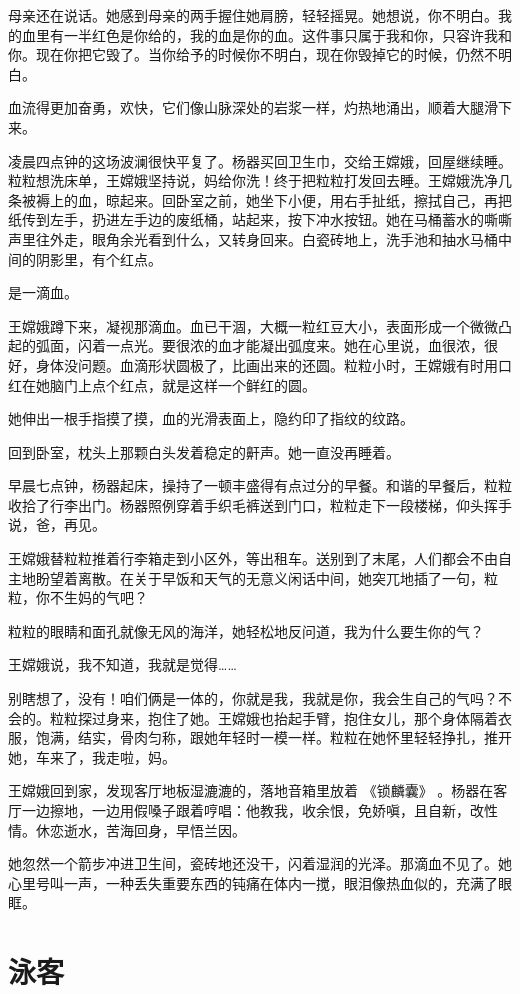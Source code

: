 \documentclass[lang=cn,newtx,12pt,scheme=chinese]{elegantbook}
\begin{document}
母亲还在说话。她感到母亲的两手握住她肩膀，轻轻摇晃。她想说，你不明白。我的血里有一半红色是你给的，我的血是你的血。这件事只属于我和你，只容许我和你。现在你把它毁了。当你给予的时候你不明白，现在你毁掉它的时候，仍然不明白。

血流得更加奋勇，欢快，它们像山脉深处的岩浆一样，灼热地涌出，顺着大腿滑下来。

凌晨四点钟的这场波澜很快平复了。杨器买回卫生巾，交给王嫦娥，回屋继续睡。粒粒想洗床单，王嫦娥坚持说，妈给你洗！终于把粒粒打发回去睡。王嫦娥洗净几条被褥上的血，晾起来。回卧室之前，她坐下小便，用右手扯纸，擦拭自己，再把纸传到左手，扔进左手边的废纸桶，站起来，按下冲水按钮。她在马桶蓄水的嘶嘶声里往外走，眼角余光看到什么，又转身回来。白瓷砖地上，洗手池和抽水马桶中间的阴影里，有个红点。

是一滴血。

王嫦娥蹲下来，凝视那滴血。血已干涸，大概一粒红豆大小，表面形成一个微微凸起的弧面，闪着一点光。要很浓的血才能凝出弧度来。她在心里说，血很浓，很好，身体没问题。血滴形状圆极了，比画出来的还圆。粒粒小时，王嫦娥有时用口红在她脑门上点个红点，就是这样一个鲜红的圆。

她伸出一根手指摸了摸，血的光滑表面上，隐约印了指纹的纹路。

回到卧室，枕头上那颗白头发着稳定的鼾声。她一直没再睡着。

早晨七点钟，杨器起床，操持了一顿丰盛得有点过分的早餐。和谐的早餐后，粒粒收拾了行李出门。杨器照例穿着手织毛裤送到门口，粒粒走下一段楼梯，仰头挥手说，爸，再见。

王嫦娥替粒粒推着行李箱走到小区外，等出租车。送别到了末尾，人们都会不由自主地盼望着离散。在关于早饭和天气的无意义闲话中间，她突兀地插了一句，粒粒，你不生妈的气吧？

粒粒的眼睛和面孔就像无风的海洋，她轻松地反问道，我为什么要生你的气？

王嫦娥说，我不知道，我就是觉得……

别瞎想了，没有！咱们俩是一体的，你就是我，我就是你，我会生自己的气吗？不会的。粒粒探过身来，抱住了她。王嫦娥也抬起手臂，抱住女儿，那个身体隔着衣服，饱满，结实，骨肉匀称，跟她年轻时一模一样。粒粒在她怀里轻轻挣扎，推开她，车来了，我走啦，妈。

王嫦娥回到家，发现客厅地板湿漉漉的，落地音箱里放着 《锁麟囊》 。杨器在客厅一边擦地，一边用假嗓子跟着哼唱：他教我，收余恨，免娇嗔，且自新，改性情。休恋逝水，苦海回身，早悟兰因。

她忽然一个箭步冲进卫生间，瓷砖地还没干，闪着湿润的光泽。那滴血不见了。她心里号叫一声，一种丢失重要东西的钝痛在体内一搅，眼泪像热血似的，充满了眼眶。
\chapter{泳客}
\end{document}
